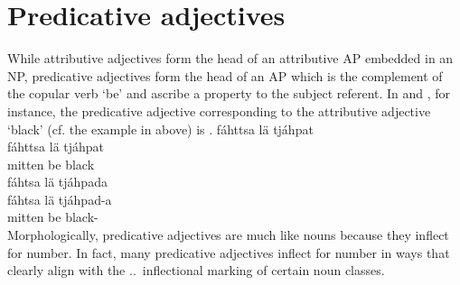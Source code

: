 \section{Predicative adjectives}\label{predADJ}%
While attributive adjectives form the head of an attributive AP embedded in an NP, predicative adjectives form the head of an AP which is the complement of the copular verb  ‘be’ and ascribe a property to the subject referent. %
In  and , for instance, the predicative adjective corresponding to the attributive adjective  ‘black’ (cf. the example in  above) is . %
\ea\label{adjPredEx1}
\glll	fáhttsa lä tjáhpat\\
	fáhttsa lä tjáhpat\\
	mitten\BS{} be\BS{} black\BS{}\\\nopagebreak
{}	
\z
\ea\label{adjPredEx2}
\glll	fáhtsa lä tjáhpada\\
	fáhtsa lä tjáhpad-a\\
	mitten\BS{} be\BS{} black-\\\nopagebreak
{}	
\z
Morphologically, predicative adjectives are much like nouns because they inflect for number. In fact, many predicative adjectives inflect for number in ways that clearly align with the \NOMs.\SGs\TILDE\NOMs.\PLs\ inflectional marking of certain noun classes. 
